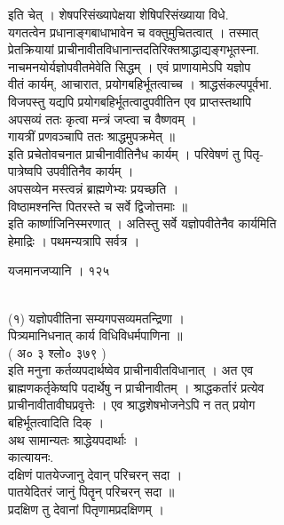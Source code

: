 \documentclass[11pt, openany]{book}
\begin{document}
{{{{{{{{{{{{{{इति चेत् । शेषपरिसंख्यापेक्षया शेषिपरिसंख्याया विधे.\\
यगतत्वेन प्रधानाङ्गबाधाभावेन च वक्तुमुचितत्वात् । तस्मात्\\
प्रेतक्रियायां प्राचीनावीतविधानान्तदतिरिक्तश्राद्धाद्यङ्गभूतस्ना.\\
नाचमनयोर्यज्ञोपवीतमेवेति सिद्धम् । एवं प्राणायामेऽपि यज्ञोप\\
वीतं कार्यम्, आचारात, प्रयोगबहिर्भूतत्वाच्च । श्राद्धसंकल्पपूर्वभा.\\
विजपस्तु यद्यपि प्रयोगबहिर्भूतत्वादुपवीतिन एव प्राप्तस्तथापि\\
अपसव्यं ततः कृत्वा मन्त्रं जप्त्वा च वैष्णवम् ।\\
गायत्रीं प्रणवञ्चापि ततः श्राद्धमुपक्रमेत् ॥\\
इति प्रचेतोवचनात प्राचीनावीतिनैध कार्यम् । परिवेषणं तु पितृ-\\
पात्रेष्वपि उपवीतिनैव कार्यम् ।\\
अपसव्येन मस्त्वन्नं ब्राह्मणेभ्यः प्रयच्छति ।\\
विष्ठामश्नन्ति पितरस्ते च सर्वे द्विजोत्तमाः ॥\\
इति कार्ष्णाजिनिस्मरणात् । अतिस्तु सर्वे यज्ञोपवीतेनैव कार्यमिति\\
हेमाद्रिः । पथमन्यत्रापि सर्वत्र ।

{ }{ यजमानजप्यानि । १२५}{\\
(१) यज्ञोपवीतिना सम्यगपसव्यमतन्द्रिणा ।\\
पित्र्यमानिधनात् कार्य विधिविधर्मपाणिना ॥\\
( अ० ३ श्लो० ३७९ )\\
इति मनुना कर्तव्यपदार्थष्वेव प्राचीनावीतविधानात् । अत एव\\
ब्राह्मणकर्तृकेष्वपि पदार्थेषु न प्राचीनावीतम् । श्राद्धकर्तारं
प्रत्येव\\
प्राचीनावीतावीघप्रवृत्तेः । एव श्राद्धशेषभोजनेऽपि न तत् प्रयोग\\
बहिर्भूतत्वादिति दिक् ।\\
अथ सामान्यतः श्राद्धेयपदार्थाः ।\\
कात्यायनः.\\
दक्षिणं पातयेज्जानु देवान् परिचरन् सदा ।\\
पातयेदितरं जानुं पितॄन् परिचरन् सदा ॥\\
प्रदक्षिण तु देवानां पितृणामप्रदक्षिणम् ।

}}}}}}}}}}}}}}}
\end{document}
